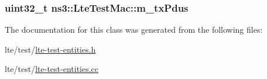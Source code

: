 \subsubsection[{\texorpdfstring{m\+\_\+tx\+Pdus}{m_txPdus}}]{\setlength{\rightskip}{0pt plus 5cm}uint32\+\_\+t ns3\+::\+Lte\+Test\+Mac\+::m\+\_\+tx\+Pdus\hspace{0.3cm}{\ttfamily [private]}}\hypertarget{classns3_1_1LteTestMac_af389dc31bf05509d27a8314b3dd6b1e1}{}\label{classns3_1_1LteTestMac_af389dc31bf05509d27a8314b3dd6b1e1}


The documentation for this class was generated from the following files\+:\begin{DoxyCompactItemize}
\item 
lte/test/\hyperlink{lte-test-entities_8h}{lte-\/test-\/entities.\+h}\item 
lte/test/\hyperlink{lte-test-entities_8cc}{lte-\/test-\/entities.\+cc}\end{DoxyCompactItemize}
